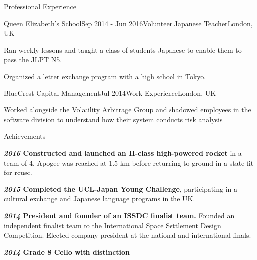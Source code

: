 \documentclass{resume} %
\begin{document}
\begin{rSection}{Professional Experience}

\begin{rSubsection}{Queen Elizabeth's School}{Sep 2014 - Jun 2016}{Volunteer Japanese Teacher}{London, UK}
    \item Ran weekly lessons and taught a class of students Japanese to enable them to pass the JLPT N5. 
    \item Organized a letter exchange program with a high school in Tokyo.
\end{rSubsection}


\begin{rSubsection}{BlueCrest Capital Management}{Jul 2014}{Work Experience}{London, UK}
    \item Worked alongside the Volatility Arbitrage Group and shadowed employees in the software division to understand how their system conducts risk analysis
\end{rSubsection}

\end{rSection}


\begin{rSection}{Achievements}
    \item \textbf{\textit{2016} Constructed and launched an H-class high-powered rocket} in a team of 4. Apogee was reached at 1.5 km before returning to ground in a state fit for reuse.
    \item \textbf{\textit{2015} Completed the UCL-Japan Young Challenge}, participating in a cultural exchange and Japanese language programs in the UK.
    \item \textbf{\textit{2014} President and founder of an ISSDC finalist team.} Founded an independent finalist team to the International Space Settlement Design Competition. Elected company president at the national and international finals.
    \item \textbf{\textit{2014} Grade 8 Cello with distinction}
\end{rSection}

\end{document}
